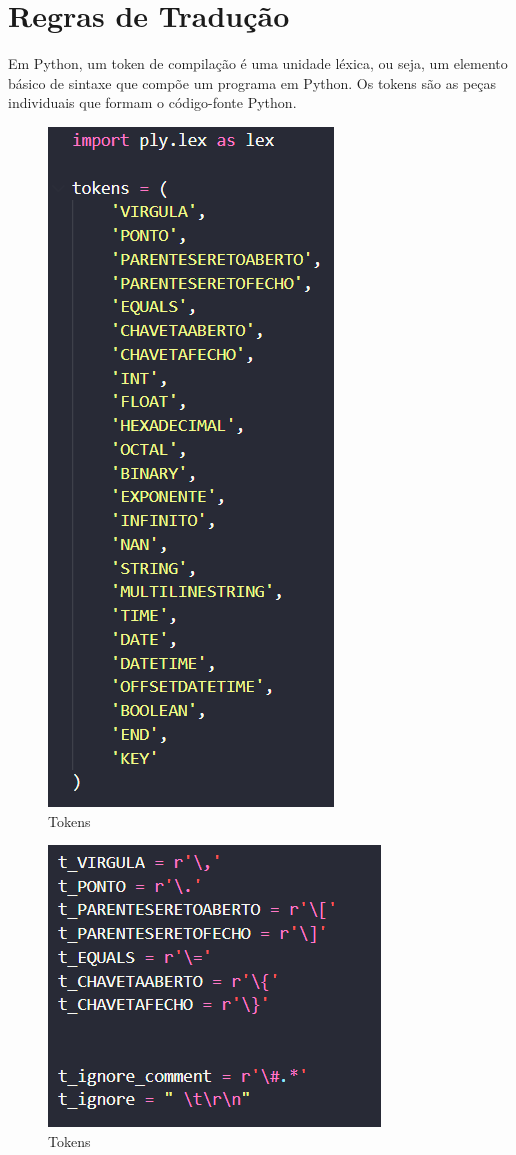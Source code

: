 \documentclass[a4paper]{report}
\begin{document}
\newpage

\section{Regras de Tradução}
Em Python, um token de compilação é uma unidade léxica, ou seja, um elemento básico de sintaxe que compõe um programa em Python. Os tokens são as peças individuais que formam o código-fonte Python.
\begin{figure}[H]
    \centering
    \includegraphics[scale=0.4]{imagens/pt.png}
    \caption{Tokens}
    \label{fig:my_label}
\end{figure}
\begin{figure}[H]
    \centering
    \includegraphics[scale=0.4]{imagens/image.png}
    \caption{Tokens}
    \label{fig:my_label}
\end{figure}
\end{document}
